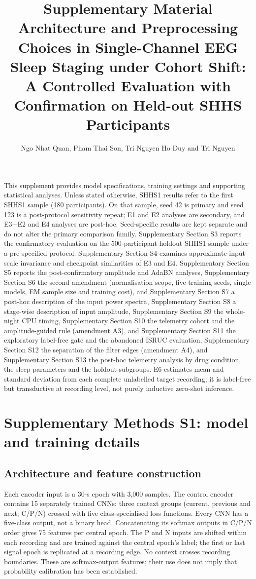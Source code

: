 \documentclass[10pt,a4paper]{article}
\title{Supplementary Material\\\large Architecture and Preprocessing Choices in Single-Channel EEG Sleep Staging under Cohort Shift: A Controlled Evaluation with Confirmation on Held-out SHHS Participants}
\author{Ngo Nhat Quan, Pham Thai Son, Tri Nguyen Ho Duy and Tri Nguyen}
\date{}
\begin{document}
\maketitle

This supplement provides model specifications, training settings and supporting statistical analyses.
Unless stated otherwise, SHHS1 results refer to the first SHHS1 sample (180 participants). On that
sample, seed 42 is primary and seed 123 is a post-protocol sensitivity repeat; E1 and E2 analyses are
secondary, and E3$-$E2 and E4 analyses are post-hoc. Seed-specific results are kept separate and do not
alter the primary comparison family. Supplementary Section S3 reports the confirmatory evaluation on
the 500-participant holdout SHHS1 sample under a pre-specified protocol. Supplementary Section S4 examines
approximate input-scale invariance and checkpoint similarities of E3 and E4. Supplementary Section S5 reports the
post-confirmatory amplitude and AdaBN analyses, Supplementary Section S6 the second amendment
(normalisation scope, five training seeds, single models, EM sample size and training cost), and
Supplementary Section S7 a post-hoc description of the input power spectra, Supplementary Section S8
a stage-wise description of input amplitude, Supplementary Section S9 the whole-night CPU timing,
Supplementary Section S10 the telemetry cohort and the amplitude-guided rule (amendment A3), and
Supplementary Section S11 the exploratory label-free gate and the abandoned ISRUC evaluation,
Supplementary Section S12 the separation of the filter edges (amendment A4), and Supplementary
Section S13 the post-hoc telemetry analysis by drug condition, the sleep parameters and the holdout subgroups.
E6 estimates mean and standard deviation from each complete unlabelled target recording; it is label-free
but transductive at recording level, not purely inductive zero-shot inference.

\section*{Supplementary Methods S1: model and training details}

\subsection*{Architecture and feature construction}

Each encoder input is a 30-s epoch with 3,000 samples. The control encoder contains 15 separately
trained CNNs: three context groups (current, previous and next; C/P/N) crossed with five
class-specialised loss functions. Every CNN has a five-class output, not a binary head. Concatenating
its softmax outputs in C/P/N order gives 75 features per central epoch. The P and N inputs are shifted
within each recording and are trained against the central epoch's label; the first or last signal
epoch is replicated at a recording edge. No context crosses recording boundaries. These are
softmax-output features; their use does not imply that probability calibration has been established.
\end{document}
